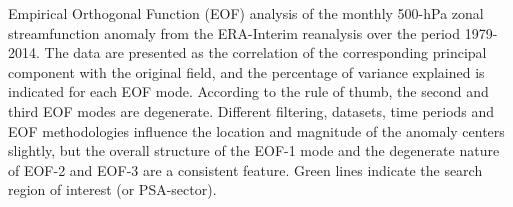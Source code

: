\label{fig:eof}
Empirical Orthogonal Function (EOF) analysis of the monthly 500-hPa zonal streamfunction anomaly from the ERA-Interim reanalysis over the period 1979-2014. The data are presented as the correlation of the corresponding principal component with the original field, and the percentage of variance explained is indicated for each EOF mode. According to the \citet{North1982} rule of thumb, the second and third EOF modes are degenerate. Different filtering, datasets, time periods and EOF methodologies influence the location and magnitude of the anomaly centers slightly, but the overall structure of the EOF-1 mode and the degenerate nature of EOF-2 and EOF-3 are a consistent feature. Green lines indicate the search region of interest (or PSA-sector).